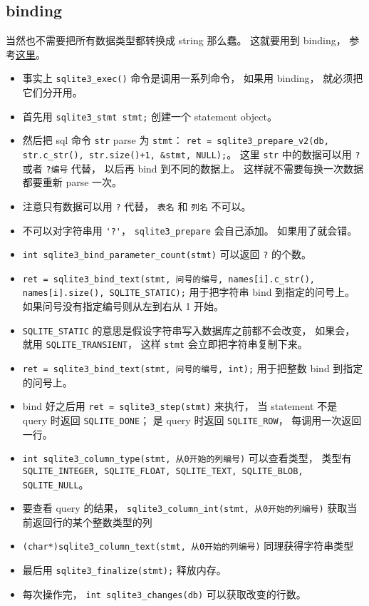 \subsection{binding}
当然也不需要把所有数据类型都转换成 string 那么蠢。 这就要用到 binding， 参考\href{https://www.sqlite.org/c3ref/bind_blob.html}{这里}。
\begin{itemize}
\item 事实上 \verb|sqlite3_exec()| 命令是调用一系列命令， 如果用 binding， 就必须把它们分开用。
\item 首先用 \verb|sqlite3_stmt stmt;| 创建一个 statement object。
\item 然后把 sql 命令 \verb|str| parse 为 \verb|stmt|： \verb|ret = sqlite3_prepare_v2(db, str.c_str(), str.size()+1, &stmt, NULL);|。 这里 \verb|str| 中的数据可以用 \verb|?| 或者 \verb|?编号| 代替， 以后再 bind 到不同的数据上。 这样就不需要每换一次数据都要重新 parse 一次。
\item 注意只有数据可以用 \verb|?| 代替， \verb|表名| 和 \verb|列名| 不可以。
\item 不可以对字符串用 \verb|'?'|， \verb|sqlite3_prepare| 会自己添加。 如果用了就会错。
\item \verb|int sqlite3_bind_parameter_count(stmt)| 可以返回 \verb|?| 的个数。
\item \verb|ret = sqlite3_bind_text(stmt, 问号的编号, names[i].c_str(), names[i].size(), SQLITE_STATIC);| 用于把字符串 bind 到指定的问号上。 如果问号没有指定编号则从左到右从 1 开始。
\item \verb|SQLITE_STATIC| 的意思是假设字符串写入数据库之前都不会改变， 如果会， 就用 \verb|SQLITE_TRANSIENT|， 这样 \verb|stmt| 会立即把字符串复制下来。
\item \verb|ret = sqlite3_bind_text(stmt, 问号的编号, int);| 用于把整数 bind 到指定的问号上。
\item bind 好之后用 \verb|ret = sqlite3_step(stmt)| 来执行， 当 statement 不是 query 时返回 \verb|SQLITE_DONE|； 是 query 时返回 \verb|SQLITE_ROW|， 每调用一次返回一行。
\item \verb|int sqlite3_column_type(stmt, 从0开始的列编号)| 可以查看类型， 类型有 \verb|SQLITE_INTEGER, SQLITE_FLOAT, SQLITE_TEXT, SQLITE_BLOB, SQLITE_NULL|。
\item 要查看 query 的结果， \verb|sqlite3_column_int(stmt, 从0开始的列编号)| 获取当前返回行的某个整数类型的列
\item \verb|(char*)sqlite3_column_text(stmt, 从0开始的列编号)| 同理获得字符串类型
\item 最后用 \verb|sqlite3_finalize(stmt);| 释放内存。
\item 每次操作完， \verb|int sqlite3_changes(db)| 可以获取改变的行数。
\end{itemize}


